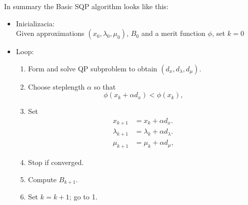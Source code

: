 In summary the Basic SQP algorithm looks like this:
\begin{itemize}
	\item Inicializacia:\\
Given approximations $(x_0,\lambda_0,\mu_0)$, $B_0$ and a merit function $\phi$, set $k=0$
\item Loop:
\begin{enumerate}
	\item Form and solve QP subproblem to obtain $(d_x,d_\lambda,d_\mu)$.
	\item Choose steplength $\alpha$ so that
	\begin{equation}
		\phi(x_k + \alpha d_x)<\phi(x_k),
	\end{equation}
	\item Set
	\begin{subequations}
		\begin{align}
		x_{k+1} &= x_k + \alpha d_x.\\
		\lambda_{k+1} &= \lambda_k + \alpha d_\lambda.\\
		\mu_{k+1} &= \mu_k + \alpha d_\mu,
		\end{align}
	\end{subequations}
	\item Stop if converged.
	\item Compute $B_{k+1}$.
	\item Set $k = k+1$; go to 1.
\end{enumerate}
\end{itemize}